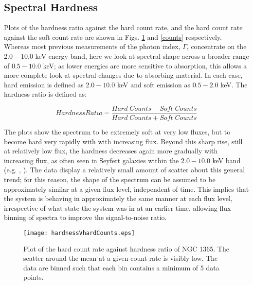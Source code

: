 \documentclass[useAMS,usenatbib]{sam}
\begin{document}
\subsection{Spectral Hardness}

Plots of the hardness ratio against the hard count rate, and the hard count rate against the soft count rate are shown in Figs. \ref{hardness} and \ref{counts}
respectively. Whereas most previous measurements of the photon index, $\Gamma$, concentrate on the $2.0-10.0$ keV energy band, here we look at spectral shape across a
broader range of $0.5-10.0$ keV; as lower energies are more sensitive to absorption, this allows a more complete look at spectral changes due to absorbing material. In
each case, hard emission is defined as $2.0 - 10.0$ keV and soft emission as $0.5-2.0$ keV. The hardness ratio is defined as: 

\begin{equation*}
Hardness Ratio = \frac{Hard\;Counts - Soft\;Counts}{Hard\;Counts + Soft\;Counts}
\end{equation*}
 
 The plots show the spectrum to be extremely soft at very low fluxes, but to become hard very rapidly with with increasing flux. Beyond this sharp rise, still at
relatively low flux, the hardness decreases again more gradually with increasing flux, as often seen in Seyfert galaxies within the $2.0-10.0$ keV band (e.g.
\citet{sobolewska}, \citet{lamer}). The data display a relatively small amount of scatter about this general trend; for this reason, the shape of the spectrum can be
assumed to be approximately similar at a given flux level, independent of time. This implies that the system is behaving in approximately the same manner at each flux
level, irrespective of what state the system was in at an earlier time, allowing flux-binning of spectra to improve the signal-to-noise ratio.

\begin{figure}
	\texttt{[image: hardnessVhardCounts.eps]}
	\caption{Plot of the hard count rate against hardness ratio of NGC 1365. The scatter around the mean at a given count rate is visibly low. The data are binned
such that each bin contains a minimum of 5 data points.}
	\label{hardness}
\end{figure}
				
\end{document}
